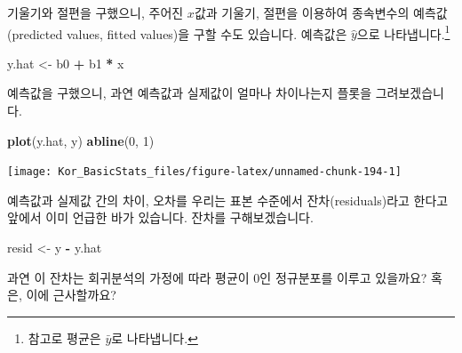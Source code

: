 \documentclass[]{book}
\newenvironment{Shaded}{\begin{snugshade}}{\end{snugshade}}
\newcommand{\DecValTok}[1]{\textcolor[rgb]{0.00,0.00,0.81}{#1}}
\newcommand{\KeywordTok}[1]{\textcolor[rgb]{0.13,0.29,0.53}{\textbf{#1}}}
\newcommand{\NormalTok}[1]{#1}
\newcommand{\OperatorTok}[1]{\textcolor[rgb]{0.81,0.36,0.00}{\textbf{#1}}}
\newcommand{\StringTok}[1]{\textcolor[rgb]{0.31,0.60,0.02}{#1}}
\let\rmarkdownfootnote\footnote%
\def\footnote{\protect\rmarkdownfootnote}
\begin{document}
\begin{Shaded}
\end{Shaded}

기울기와 절편을 구했으니, 주어진 \(x\)값과 기울기, 절편을 이용하여 종속변수의 예측값(predicted values, fitted values)을 구할 수도 있습니다. 예측값은 \(\hat{y}\)으로 나타냅니다.\footnote{참고로 평균은 \(\bar{y}\)로 나타냅니다.}

\begin{Shaded}
\begin{Highlighting}[]
\NormalTok{y.hat <-}\StringTok{ }\NormalTok{b0 }\OperatorTok{+}\StringTok{ }\NormalTok{b1 }\OperatorTok{*}\StringTok{ }\NormalTok{x}
\end{Highlighting}
\end{Shaded}

예측값을 구했으니, 과연 예측값과 실제값이 얼마나 차이나는지 플롯을 그려보겠습니다.

\begin{Shaded}
\begin{Highlighting}[]
\KeywordTok{plot}\NormalTok{(y.hat, y)}
\KeywordTok{abline}\NormalTok{(}\DecValTok{0}\NormalTok{, }\DecValTok{1}\NormalTok{)}
\end{Highlighting}
\end{Shaded}

\begin{center}\texttt{[image: Kor\_BasicStats\_files/figure-latex/unnamed-chunk-194-1]} \end{center}

예측값과 실제값 간의 차이, 오차를 우리는 표본 수준에서 잔차(residuals)라고 한다고 앞에서 이미 언급한 바가 있습니다. 잔차를 구해보겠습니다.

\begin{Shaded}
\begin{Highlighting}[]
\NormalTok{resid <-}\StringTok{ }\NormalTok{y }\OperatorTok{-}\StringTok{ }\NormalTok{y.hat}
\end{Highlighting}
\end{Shaded}

과연 이 잔차는 회귀분석의 가정에 따라 평균이 0인 정규분포를 이루고 있을까요? 혹은, 이에 근사할까요?
\end{document}
